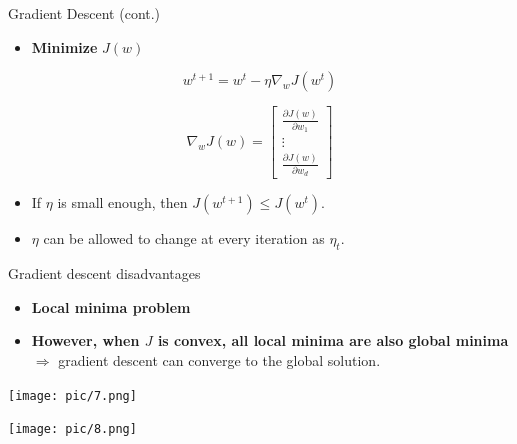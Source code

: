 \documentclass[serif, aspectratio=169]{beamer}
\begin{document}
    \begin{frame}{Gradient Descent (cont.)}

        \begin{itemize}
            \item \textbf{Minimize} \( J(w) \)
        \end{itemize}

        \[
            w^{t+1} = w^t - \eta \nabla_w J(w^t)
        \]

        \[
            \nabla_w J(w) =
            \begin{bmatrix}
                \frac{\partial J(w)}{\partial w_1} \\
                \vdots \\
                \frac{\partial J(w)}{\partial w_d}
            \end{bmatrix}
        \]

        \begin{itemize}
            \item If \( \eta \) is small enough, then \( J(w^{t+1}) \leq J(w^t) \).
            \item \( \eta \) can be allowed to change at every iteration as \( \eta_t \).
        \end{itemize}

    \end{frame}

    \begin{frame}{Gradient descent disadvantages}

        \begin{itemize}
            \item \textbf{Local minima problem}

            \item \textbf{However, when \( J \) is convex, all local minima are also global minima} \(\Rightarrow\) gradient descent can converge to the global solution.
        \end{itemize}

        \begin{minipage}{0.48\textwidth}
            \centering
            \texttt{[image: pic/7.png]}
        \end{minipage}%
        \begin{minipage}{0.48\textwidth}
            \centering
            \texttt{[image: pic/8.png]}
        \end{minipage}
        \vfill

    \end{frame}
\end{document}
